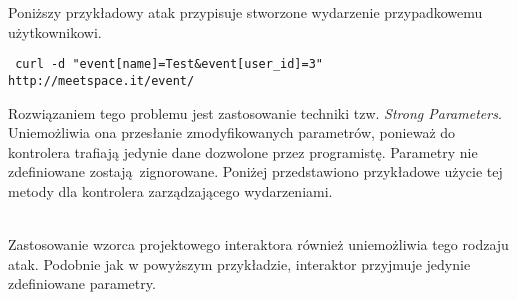 Poniższy przykładowy atak przypisuje stworzone wydarzenie przypadkowemu użytkownikowi.

\texttt{ \footnotesize curl -d "event[name]=Test\&event[user\_id]=3" http://meetspace.it/event/ }

Rozwiązaniem tego problemu jest zastosowanie techniki tzw. \emph{Strong Parameters}. Uniemożliwia  ona przesłanie zmodyfikowanych parametrów, ponieważ do kontrolera trafiają jedynie dane dozwolone przez programistę. Parametry nie zdefiniowane zostają zignorowane. Poniżej przedstawiono przykładowe użycie tej metody dla kontrolera zarządzającego wydarzeniami.

\begin{code}
  
\end{code}\\
Zastosowanie wzorca projektowego interaktora również uniemożliwia tego rodzaju atak. Podobnie jak w powyższym przykładzie, interaktor przyjmuje jedynie zdefiniowane parametry.

\begin{code}
  
\end{code}\\
